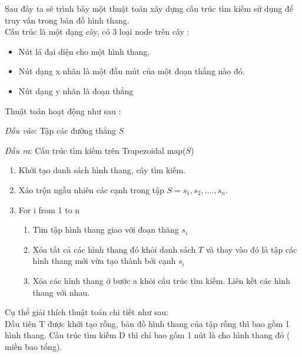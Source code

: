\documentclass[a4paper,12pt]{report}
\begin{document}
Sau đây ta sẽ trình bày một thuật toán xây dựng cấu trúc tìm kiếm sử dụng để truy vấn trong bản đồ hình thang.\\

Cấu trúc là một dạng cây, có 3 loại node trên cây :
\begin{itemize}
\item Nút lá đại diện cho một hình thang.
\item Nút dạng x nhãn là một đầu mút của một đoạn thẳng nào đó.
\item Nút dạng y nhãn là đoạn thẳng
\end{itemize}

Thuật toán hoạt động như sau :

\emph{Đầu vào}: Tập các đường thẳng $S$

\emph{Đầu ra}: Cấu trúc tìm kiếm trên Trapezoidal map($S$)

\begin{enumerate}
\item Khởi tạo danh sách hình thang, cây tìm kiếm.
\item Xáo trộn  ngẫu nhiên các cạnh trong tập $S = {s_1, s_2, ...., s_n}$.
\item For i from 1 to n  
\begin{enumerate}
\item Tìm tập hình thang giao với đoạn thăng $s_i$
\item Xóa tất cả các hình thang đó khỏi danh sách $T$ và thay vào đó là tập các hình thang mới vừa tạo thành bởi cạnh $s_i$
\item Xóa các hình thang ở bước a khỏi cấu trúc tìm kiếm. Liên kết các hình thang với nhau.
\end{enumerate}
\end{enumerate}
Cụ thể giải thích thuật toán chi tiết như sau: \\

Đầu tiên T được khởi tạo rỗng, bản đồ hình thang của tập rỗng thì bao gồm 1 hình thang. Cấu trúc tìm kiếm D thì chỉ bao gốm 1 nút là cho hình thang đó ( miền bao tổng). 
\end{document}

